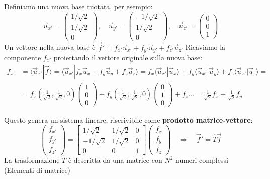 \documentclass[11pt, a4paper]{article}
\begin{document}
Definiamo una nuova base ruotata, per esempio: %
\begin{equation*}
    \vec{u}_{x'} = \begin{pmatrix} 1/\sqrt{2} \\ 1/\sqrt{2} \\ 0 \end{pmatrix} , \quad \vec{u}_{y'} = \begin{pmatrix} -1/\sqrt{2} \\ 1/\sqrt{2} \\ 0 \end{pmatrix} , \quad \vec{u}_{z'} = \begin{pmatrix} 0 \\ 0 \\ 1 \end{pmatrix} %
\end{equation*}
Un vettore nella nuova base è $\vec{f}' = f_{x'} \vec{u}_{x'} + f_{y'} \vec{u}_{y'} + f_{z'} \vec{u}_{z'}$ %
Ricaviamo la componente $f_{x'}$ proiettando il vettore originale sulla nuova base: %
\begin{align*}
    f_{x'} &= \langle \vec{u}_{x'} | \vec{f} \rangle = \langle \vec{u}_{x'} | f_x \vec{u}_x + f_y \vec{u}_y + f_z \vec{u}_z \rangle = f_x \langle \vec{u}_{x'} | \vec{u}_x \rangle + f_y \langle \vec{u}_{x'} | \vec{u}_y \rangle + f_z \langle \vec{u}_{x'} | \vec{u}_z \rangle = \\ %
           &= f_x \left( \frac{1}{\sqrt{2}}, \frac{1}{\sqrt{2}}, 0 \right) \begin{pmatrix} 1 \\ 0 \\ 0 \end{pmatrix} + f_y \left( \frac{1}{\sqrt{2}}, \frac{1}{\sqrt{2}}, 0 \right) \begin{pmatrix} 0 \\ 1 \\ 0 \end{pmatrix} + f_z \dots = \frac{1}{\sqrt{2}}f_x + \frac{1}{\sqrt{2}}f_y %
\end{align*}

Questo genera un sistema lineare, riscrivibile come \textbf{prodotto matrice-vettore}: %
\begin{equation*}
    \begin{pmatrix} f_{x'} \\ f_{y'} \\ f_{z'} \end{pmatrix} = \begin{bmatrix} 1/\sqrt{2} & 1/\sqrt{2} & 0 \\ -1/\sqrt{2} & 1/\sqrt{2} & 0 \\ 0 & 0 & 1 \end{bmatrix} \begin{pmatrix} f_x \\ f_y \\ f_z \end{pmatrix} \quad \Rightarrow \quad \vec{f}' = \hat{T}\vec{f} %
\end{equation*}
La trasformazione $\hat{T}$ è descritta da una matrice con $N^2$ numeri complessi (Elementi di matrice) %
\end{document}
